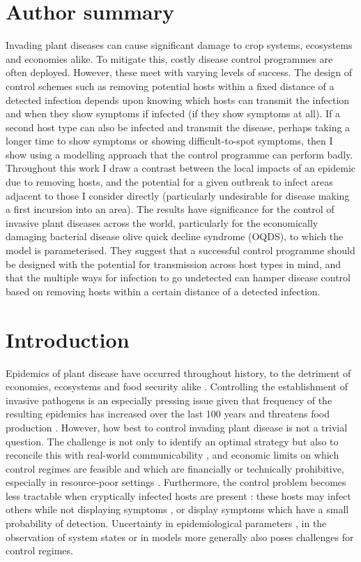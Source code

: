 \documentclass[11pt,letterpaper]{article}
\begin{document}
\section*{Author summary}

Invading plant diseases can cause significant damage to crop systems,  ecosystems and economies alike. To mitigate this, costly disease control programmes are often deployed. However, these meet with varying levels of success. The design of control schemes such as removing potential hosts within a fixed distance of a detected infection depends upon knowing which hosts can transmit the infection and when they show symptoms if infected (if they show symptoms at all). If a second host type can also be infected and transmit the disease, perhaps taking a longer time to show symptoms or showing difficult-to-spot symptoms, then I show using a modelling approach that the control programme can perform badly. Throughout this work I draw a contrast between the local impacts of an epidemic due to removing hosts, and the potential for a given outbreak to infect areas adjacent to those I consider directly (particularly undesirable for disease making a first incursion into an area). The results have significance for the control of invasive plant diseases across the world, particularly for the economically damaging bacterial disease olive quick decline syndrome (OQDS), to which the model is parameterised. They suggest that a successful control programme should be designed with the potential for transmission across host types in mind, and that the multiple ways for infection to go undetected can hamper disease control based on removing hosts within a certain distance of a detected infection.

\section*{Introduction}

Epidemics of plant disease have occurred throughout history, to the detriment of economies, ecosystems and food security alike \cite{Boyd2013}. Controlling the establishment of invasive pathogens is an  especially pressing issue given that frequency of the resulting epidemics has increased over the last 100 years \cite{Montgomery2023} and threatens food production \cite{Fones2020, Ristaino2021}. However, how best to control invading plant disease is not a trivial question. The challenge is not only to identify an optimal strategy but also to reconcile this with real-world communicability \cite{Cunniffe2015}, and economic limits on which control regimes are feasible and which are financially or technically prohibitive, especially in resource-poor settings \cite{Jeger2021}. Furthermore, the control problem becomes less tractable when cryptically infected hosts are present \cite{Filipe2012}: these hosts may infect others while not displaying symptoms \cite{Lee2015}, or display symptoms which have a small probability of detection. Uncertainty in epidemiological parameters \cite{Cunniffe2015, Habibzadeh2010}, in the observation of system states \cite{McClintock2010} or in models more generally \cite{Christley2013} also poses challenges for control regimes.
\end{document}
